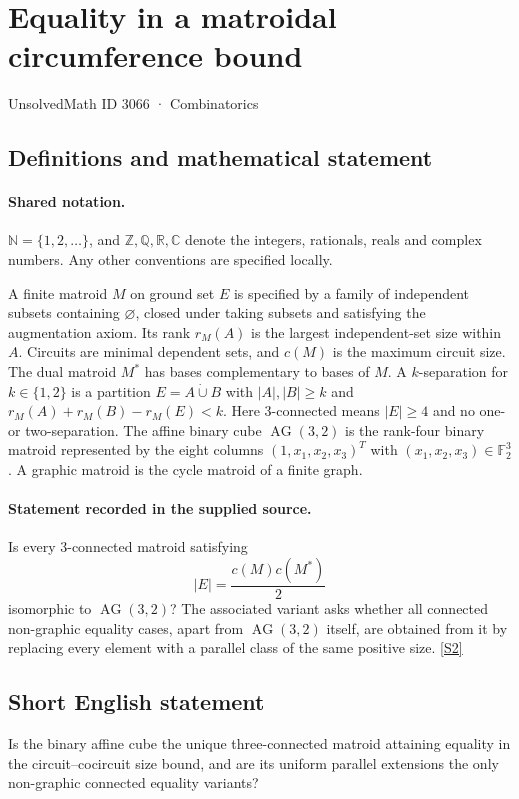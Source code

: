 \documentclass[11pt]{book}
\newcommand{\sref}[2]{\hyperlink{source:#1:#2}{[S#2]}}
\begin{document}
\setcounter{section}{3065}
\section{Equality in a matroidal circumference bound}\label{3066}
{\small\sffamily UnsolvedMath ID 3066 · Combinatorics}
\subsection{Definitions and mathematical statement}

\paragraph{Shared notation.}$\mathbb N=\{1,2,\ldots\}$, and $\mathbb Z,\mathbb Q,\mathbb R,\mathbb C$ denote the integers, rationals, reals and complex numbers. Any other conventions are specified locally.


A finite matroid $M$ on ground set $E$ is specified by a family of independent subsets containing $\varnothing$, closed under taking subsets and satisfying the augmentation axiom. Its rank $r_M(A)$ is the largest independent-set size within $A$. Circuits are minimal dependent sets, and $c(M)$ is the maximum circuit size. The dual matroid $M^*$ has bases complementary to bases of $M$. A $k$-separation for $k\in\{1,2\}$ is a partition $E=A\mathbin{\dot\cup}B$ with $|A|,|B|\geq k$ and $r_M(A)+r_M(B)-r_M(E)<k$. Here $3$-connected means $|E|\geq4$ and no one- or two-separation. The affine binary cube $\operatorname{AG}(3,2)$ is the rank-four binary matroid represented by the eight columns $(1,x_1,x_2,x_3)^T$ with $(x_1,x_2,x_3)\in\mathbb F_2^3$. A graphic matroid is the cycle matroid of a finite graph.
\paragraph{Statement recorded in the supplied source.}
Is every $3$-connected matroid satisfying
\[|E|=\frac{c(M)c(M^*)}{2}\]
isomorphic to $\operatorname{AG}(3,2)$? The associated variant asks whether all connected non-graphic equality cases, apart from $\operatorname{AG}(3,2)$ itself, are obtained from it by replacing every element with a parallel class of the same positive size. \sref{3066}{2}
\subsection{Short English statement}
Is the binary affine cube the unique three-connected matroid attaining equality in the circuit--cocircuit size bound, and are its uniform parallel extensions the only non-graphic connected equality variants?
\end{document}
